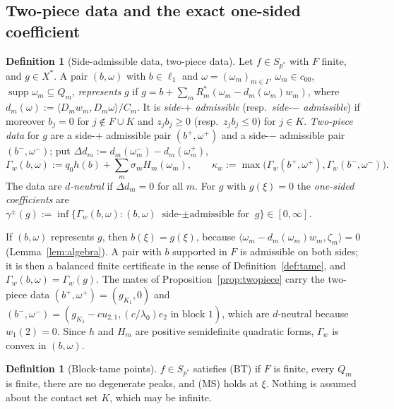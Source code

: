 \documentclass[10pt]{amsart}
\theoremstyle{definition}
\newtheorem{definition}[theorem]{Definition}
\theoremstyle{remark}
\newcommand{\supp}{\operatorname{supp}}
\newcommand{\ip}[2]{\langle #1,#2\rangle}
\begin{document}
\subsection{Two-piece data and the exact one-sided coefficient}

\begin{definition}[Side-admissible data, two-piece data]\label{def:twopiece}
Let $f\in S_{p^*}$ with $F$ finite, and $g\in X^*$.  A pair $(b,\omega)$
with $b\in\ell_1$ and $\omega=(\omega_m)_{m\in I}$, $\omega_m\in c_{00}$,
$\supp\omega_m\subseteq Q_m$, \emph{represents} $g$ if
$g=b+\sum_mR_m^*(\omega_m-d_m(\omega_m)w_m)$, where
$d_m(\omega):=\ip{D_mw_m}{D_m\omega}/C_m$.  It is \emph{side-$+$ admissible}
\textup{(}resp.\ \emph{side-$-$ admissible}\textup{)} if moreover $b_j=0$
for $j\notin F\cup K$ and $z_jb_j\ge0$ \textup{(}resp.\ $z_jb_j\le0$\textup{)}
for $j\in K$.  \emph{Two-piece data} for $g$ are a side-$+$ admissible pair
$(b^+,\omega^+)$ and a side-$-$ admissible pair $(b^-,\omega^-)$; put
$\Delta d_m:=d_m(\omega^-_m)-d_m(\omega^+_m)$,
\[
 \Gamma_w(b,\omega):=q_0h(b)+\sum_m\sigma_mH_m(\omega_m),\qquad
 \kappa_w:=\max\big(\Gamma_w(b^+,\omega^+),\Gamma_w(b^-,\omega^-)\big).
\]
The data are \emph{$d$-neutral} if $\Delta d_m=0$ for all $m$.  For $g$ with
$g(\xi)=0$ the \emph{one-sided coefficients} are
$\gamma^\pm(g):=\inf\{\Gamma_w(b,\omega):(b,\omega)\text{ side-$\pm$
admissible for }g\}\in[0,\infty]$.
\end{definition}

If $(b,\omega)$ represents $g$, then $b(\xi)=g(\xi)$, because
$\ip{\omega_m-d_m(\omega_m)w_m}{\zeta_m}=0$ (Lemma~\ref{lem:algebra}).  A
pair with $b$ supported in $F$ is admissible on both sides; it is then a
balanced finite certificate in the sense of Definition~\ref{def:tame}, and
$\Gamma_w(b,\omega)=\Gamma_w(g)$.  The mates of
Proposition~\ref{prop:twopiece} carry the two-piece data
$(b^+,\omega^+)=(g_{K_1},0)$ and $(b^-,\omega^-)=(g_{K_1}-cu_{2,1},
(c/\lambda_0)e_2\text{ in block }1)$, which are $d$-neutral because
$w_1(2)=0$.  Since $h$ and $H_m$ are positive semidefinite quadratic forms,
$\Gamma_w$ is convex in $(b,\omega)$.

\begin{definition}[Block-tame points]\label{def:BT}
$f\in S_{p^*}$ satisfies \textup{(BT)} if $F$ is finite, every $Q_m$ is
finite, there are no degenerate peaks, and \textup{(MS)} holds at $\xi$.
Nothing is assumed about the contact set $K$, which may be infinite.
\end{definition}
\end{document}
